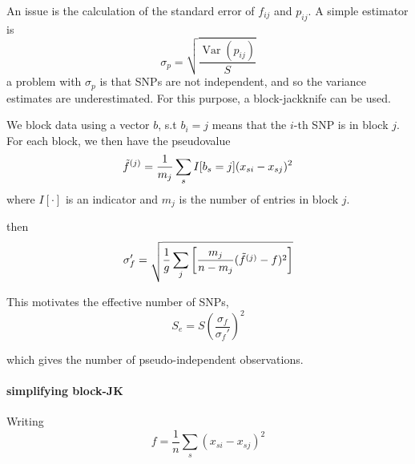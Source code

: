 \documentclass[12pt, letterpaper]{article}
\begin{document}
An issue is the calculation of the standard error of $f_{ij}$ and $p_{ij}$. A simple estimator is 
\begin{equation}
    \sigma_p = \sqrt{\frac{\operatorname{Var}(p_{ij})}{S} }
\end{equation}
a problem with $\sigma_p$ is that SNPs are not independent, and so the variance estimates are underestimated. For this purpose, a block-jackknife can be used.

We block data using a vector $b$, s.t $b_i = j$ means that the $i$-th SNP is in block $j$. For each block, we then have the pseudovalue 
$$\Tilde{f}^{(j)} = \frac{1}{m_j} \sum_s I[b_s =j] (x_{si} - x_{sj})^2  $$
where $I[\cdot]$ is an indicator and $m_j$ is the number of entries in block $j$.

then
\begin{equation}
    \sigma_f' = \sqrt{ \frac{1}{g} \sum_j \left[ \frac{m_j}{n-m_j}( \Tilde{f}^{(j)} - f)^2  \right] }
\end{equation}

This motivates the effective number of SNPs, 
\begin{equation}
    S_e = S \left(\frac{ \sigma_f}{\sigma_f'} \right)^2
\end{equation}

which gives the number of pseudo-independent observations.

\paragraph{simplifying block-JK}
Writing
$$f = \frac{1}{n}\sum_s (x_{si} - x_{sj})^2$$






\end{document}
